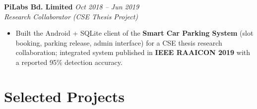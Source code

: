 \documentclass[a4paper,10pt]{article}
\begin{document}
\vspace{1.5mm}
\noindent\textbf{PiLabs Bd. Limited} \hfill \textit{Oct 2018 -- Jun 2019}\\
\textit{Research Collaborator (CSE Thesis Project)}
\begin{itemize}[leftmargin=*, noitemsep, topsep=2pt, parsep=0pt, partopsep=0pt]
    \item Built the Android + SQLite client of the \textbf{Smart Car Parking System} (slot booking, parking release, admin interface) for a CSE thesis research collaboration; integrated system published in \textbf{IEEE RAAICON 2019} with a reported 95\% detection accuracy.
\end{itemize}

\vspace{-3mm}

\section*{Selected Projects}
\vspace{-4mm}
\end{document}
